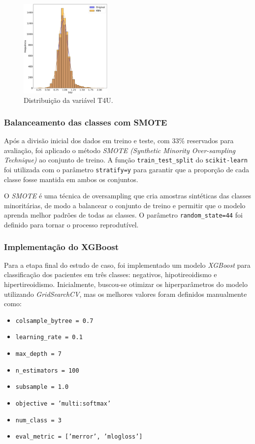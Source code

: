\documentclass[11pt]{article}
\begin{document}
\begin{figure}[H]
    \centering
    \includegraphics[width=0.4\textwidth]{img/T4U_distrib.png}
    \caption{Distribuição da variável T4U.}
    \label{fig:T4U_distrib}
\end{figure}

\subsubsection{Balanceamento das classes com SMOTE}

Após a divisão inicial dos dados em treino e teste, com 33\% reservados para avaliação, foi aplicado o método \textit{SMOTE (Synthetic Minority Over-sampling Technique)} ao conjunto de treino. A função \texttt{train\_test\_split} do \texttt{scikit-learn} foi utilizada com o parâmetro \texttt{stratify=y} para garantir que a proporção de cada classe fosse mantida em ambos os conjuntos.

O \textit{SMOTE} é uma técnica de oversampling que cria amostras sintéticas das classes minoritárias, de modo a balancear o conjunto de treino e permitir que o modelo aprenda melhor padrões de todas as classes. O parâmetro \texttt{random\_state=44} foi definido para tornar o processo reprodutível.  

\subsubsection{Implementação do XGBoost}

Para a etapa final do estudo de caso, foi implementado um modelo \textit{XGBoost} para classificação dos pacientes em três classes: negativos, hipotireoidismo e hipertireoidismo. Inicialmente, buscou-se otimizar os hiperparâmetros do modelo utilizando \textit{GridSearchCV}, mas os melhores valores foram definidos manualmente como:

\begin{itemize}
    \item \texttt{colsample\_bytree = 0.7} 
    \item \texttt{learning\_rate = 0.1} 
    \item \texttt{max\_depth = 7} 
    \item \texttt{n\_estimators = 100} 
    \item \texttt{subsample = 1.0} 
    \item \texttt{objective = 'multi:softmax'} 
    \item \texttt{num\_class = 3} 
    \item \texttt{eval\_metric = ['merror', 'mlogloss']}
\end{itemize}
\end{document}

